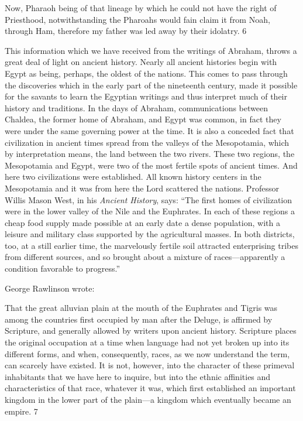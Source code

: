 Now, Pharaoh being of that lineage by which he could not have the right of Priesthood,
notwithstanding the Pharoahs would fain claim it from Noah, through Ham, therefore my
father was led away by their idolatry. 6

This information which we have received from the writings of Abraham, throws a great deal
of light on ancient history. Nearly all ancient histories begin with Egypt as being, perhaps,
the oldest of the nations. This comes to pass through the discoveries which in the early part
of the nineteenth century, made it possible for the savants to learn the Egyptian writings and
thus interpret much of their history and traditions. In the days of Abraham, communications
between Chaldea, the former home of Abraham, and Egypt was common, in fact they were
under the same governing power at the time. It is also a conceded fact that civilization in
ancient times spread from the valleys of the Mesopotamia, which by interpretation means,
the land between the two rivers. These two regions, the Mesopotamia and Egypt, were two of
the most fertile spots of ancient times. And here two civilizations were established. All
known history centers in the Mesopotamia and it was from here the Lord scattered the
nations. Professor Willis Mason West, in his \textit{Ancient History}, says: ``The first homes of
civilization were in the lower valley of the Nile and the Euphrates. In each of these regions a
cheap food supply made possible at an early date a dense population, with a leisure and
military class supported by the agricultural masses. In both districts, too, at a still earlier
time, the marvelously fertile soil attracted enterprising tribes from different sources, and so
brought about a mixture of races—apparently a condition favorable to progress.''

George Rawlinson wrote:

That the great alluvian plain at the mouth of the Euphrates and Tigris was among the
countries first occupied by man after the Deluge, is affirmed by Scripture, and generally
allowed by writers upon ancient history. Scripture places the original occupation at a time
when language had not yet broken up into its different forms, and when, consequently, races,
as we now understand the term, can scarcely have existed. It is not, however, into the
character of these primeval inhabitants that we have here to inquire, but into the ethnic
affinities and characteristics of that race, whatever it was, which first established an
important kingdom in the lower part of the plain—a kingdom which eventually became an
empire. 7

